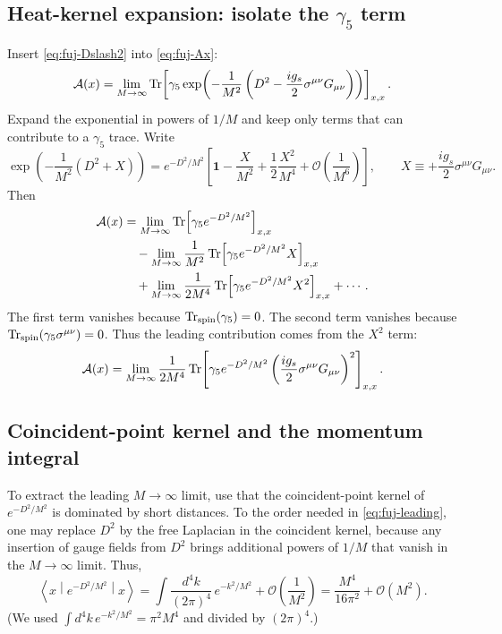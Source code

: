 \documentclass[11pt]{article}
\theoremstyle{remark}
\newcommand{\cO}{\mathcal{O}}
\begin{document}
\subsection{Heat-kernel expansion: isolate the $\gamma_5$ term}
Insert \eqref{eq:fuj-Dslash2} into \eqref{eq:fuj-Ax}:
\begin{equation}
\mathcal{A}(x)=\lim_{M\to\infty}\Tr\!\left[\gamma_5\exp\!\left(-\frac{1}{M^2}\left(D^2 - \frac{i g_s}{2}\sigma^{\mu\nu}G_{\mu\nu}\right)\right)\right]_{x,x}.
\end{equation}
Expand the exponential in powers of $1/M$ and keep only terms that can contribute to a $\gamma_5$
trace. Write
\begin{equation}
\exp\!\left(-\frac{1}{M^2}(D^2+X)\right)
=
e^{-D^2/M^2}\left[\mathbf{1}-\frac{X}{M^2}+\frac{1}{2}\frac{X^2}{M^4}+\cO\!\left(\frac{1}{M^6}\right)\right],
\qquad
X\equiv +\frac{i g_s}{2}\sigma^{\mu\nu}G_{\mu\nu}.
\end{equation}
Then
\begin{align}
\mathcal{A}(x)
&=\lim_{M\to\infty}\Tr\!\left[\gamma_5 e^{-D^2/M^2}\right]_{x,x} \notag\\
&\quad -\lim_{M\to\infty}\frac{1}{M^2}\Tr\!\left[\gamma_5 e^{-D^2/M^2}X\right]_{x,x} \notag\\
&\quad +\lim_{M\to\infty}\frac{1}{2M^4}\Tr\!\left[\gamma_5 e^{-D^2/M^2}X^2\right]_{x,x}
+\cdots . \notag
\end{align}
The first term vanishes because $\Tr_{\mathrm{spin}}(\gamma_5)=0$.
The second term vanishes because $\Tr_{\mathrm{spin}}(\gamma_5\sigma^{\mu\nu})=0$.
Thus the leading contribution comes from the $X^2$ term:
\begin{equation}\label{eq:fuj-leading}
\mathcal{A}(x)=\lim_{M\to\infty}\frac{1}{2M^4}\Tr\!\left[\gamma_5 e^{-D^2/M^2}\left(\frac{i g_s}{2}\sigma^{\mu\nu}G_{\mu\nu}\right)^2\right]_{x,x}.
\end{equation}

\subsection{Coincident-point kernel and the momentum integral}
To extract the leading $M\to\infty$ limit, use that the coincident-point kernel of $e^{-D^2/M^2}$
is dominated by short distances. To the order needed in \eqref{eq:fuj-leading}, one may replace
$D^2$ by the free Laplacian in the coincident kernel, because any insertion of gauge fields from $D^2$
brings additional powers of $1/M$ that vanish in the $M\to\infty$ limit.
Thus,
\begin{equation}\label{eq:fuj-kernel}
\left\langle x\middle| e^{-D^2/M^2}\middle|x\right\rangle
=
\int\frac{d^4k}{(2\pi)^4}\,e^{-k^2/M^2} + \cO\!\left(\frac{1}{M^2}\right)
=
\frac{M^4}{16\pi^2}+\cO(M^2).
\end{equation}
(We used $\int d^4k\,e^{-k^2/M^2}=\pi^2 M^4$ and divided by $(2\pi)^4$.)
\end{document}
